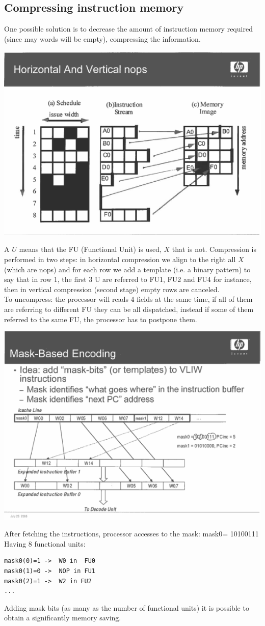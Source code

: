 \subsection{Compressing instruction memory}
One possible solution is to decrease the amount of instruction memory required
(since may words will be empty), compressing the information.
\begin{center}
  \includegraphics[width=0.6\linewidth]{img/img3/compr1}
\end{center}
A $U$ means that the FU (Functional Unit) is used, $X$ that is not. Compression
is performed in two steps: in horizontal compression we align to the right all
$X$ (which are nops) and for each row we add a template (i.e. a binary pattern)
to say that in row 1, the first 3 U are referred to FU1, FU2 and FU4 for
instance, then in vertical compression (second stage) empty rows are
canceled.\\ To uncompress: the processor will reads 4 fields at the same time,
if all of them are referring to different FU they can be all dispatched,
instead if some of them referred to the same FU, the processor has to postpone
them.
\begin{center}
  \includegraphics[width=0.6\linewidth]{img/img3/compr2}
\end{center}
After fetching the instructions, processor accesses to the mask: mask0=
10100111 \\ Having 8 functional units:
\begin{verbatim}
mask0(0)=1 ->  W0 in  FU0
mask0(1)=0 ->  NOP in FU1
mask0(2)=1 ->  W2 in FU2
...
\end{verbatim}
Adding mask bits (as many as the number of functional units) it is possible to
obtain a significantly memory saving.

